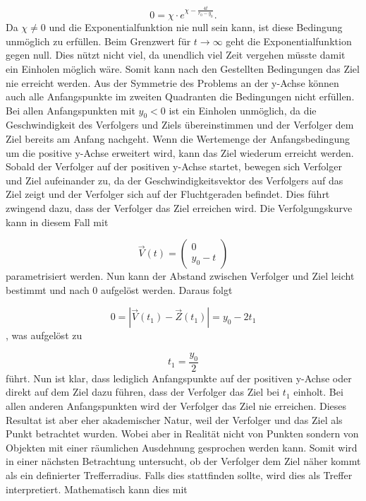 \begin{equation}
    0
    =
    \chi\cdot e^{\chi-\frac{4t}{r_0-y_0}}
    \text{.}
\end{equation}
%
Da $\chi\neq0$ und die Exponentialfunktion nie null sein kann, ist diese Bedingung unmöglich zu erfüllen.
Beim Grenzwert für $t\rightarrow\infty$ geht die Exponentialfunktion gegen null.
Dies nützt nicht viel, da unendlich viel Zeit vergehen müsste damit ein Einholen möglich wäre.
Somit kann nach den Gestellten Bedingungen das Ziel nie erreicht werden.
Aus der Symmetrie des Problems an der y-Achse können auch alle Anfangspunkte im zweiten Quadranten die Bedingungen nicht erfüllen.
Bei allen Anfangspunkten mit $y_0<0$ ist ein Einholen unmöglich, da die Geschwindigkeit des Verfolgers und Ziels übereinstimmen und der Verfolger dem Ziel bereits am Anfang nachgeht.
Wenn die Wertemenge der Anfangsbedingung um die positive y-Achse erweitert wird, kann das Ziel wiederum erreicht werden.
Sobald der Verfolger auf der positiven y-Achse startet, bewegen sich Verfolger und Ziel aufeinander zu, da der Geschwindigkeitsvektor des Verfolgers auf das Ziel zeigt und der Verfolger sich auf der Fluchtgeraden befindet.
Dies führt zwingend dazu, dass der Verfolger das Ziel erreichen wird.
Die Verfolgungskurve kann in diesem Fall mit

\begin{equation}
    \vec{V}(t)
    =
    \left( \begin{array}{c} 0 \\ y_0-t \end{array} \right)
\end{equation}
%
parametrisiert werden.
Nun kann der Abstand zwischen Verfolger und Ziel leicht bestimmt und nach 0 aufgelöst werden.
Daraus folgt

\begin{equation}
    0
    =
    |\vec{V}(t_1)-\vec{Z}(t_1)|
    =
    y_0-2t_1
\end{equation}
%
, was aufgelöst zu

\begin{equation}
    t_1
    =
    \frac{y_0}{2}
\end{equation}
%
führt.
Nun ist klar, dass lediglich Anfangspunkte auf der positiven y-Achse oder direkt auf dem Ziel dazu führen, dass der Verfolger das Ziel bei $t_1$ einholt.
Bei allen anderen Anfangspunkten wird der Verfolger das Ziel nie erreichen.
Dieses Resultat ist aber eher akademischer Natur, weil der Verfolger und das Ziel als Punkt betrachtet wurden.
Wobei aber in Realität nicht von Punkten sondern von Objekten mit einer räumlichen Ausdehnung gesprochen werden kann.
Somit wird in einer nächsten Betrachtung untersucht, ob der Verfolger dem Ziel näher kommt als ein definierter Trefferradius.
Falls dies stattfinden sollte, wird dies als Treffer interpretiert.
Mathematisch kann dies mit

